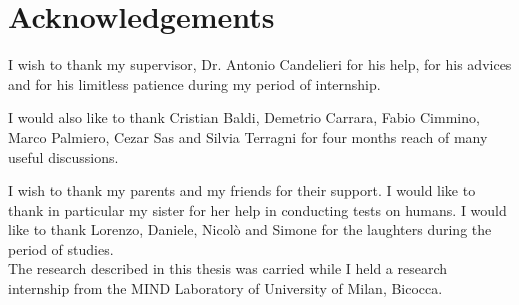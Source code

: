\chapter*{Acknowledgements}
\pagestyle{empty}

I wish to thank my supervisor, Dr. Antonio Candelieri for his help, for his advices and for his limitless patience during my period of internship.

I would also like to thank Cristian Baldi, Demetrio Carrara, Fabio Cimmino, Marco Palmiero, Cezar Sas and Silvia Terragni for four months reach of many useful discussions.

I wish to thank my parents and my friends for their support. I would like to thank in particular my sister for her help in conducting tests on humans. I would like to thank Lorenzo, Daniele, Nicolò and Simone for the laughters during the period of studies. \\

The research described in this thesis was carried while I held a research internship from the MIND Laboratory of University of Milan, Bicocca. \\

